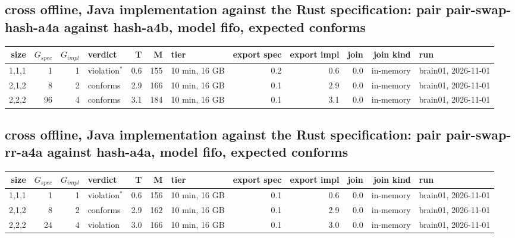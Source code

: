 \documentclass[10pt]{article}
\begin{document}
\subsection*{cross offline, Java implementation against the Rust specification: pair \textsf{pair-swap-hash-a4a} against \textsf{hash-a4b}, model fifo, expected conforms}
\begin{longtable}{@{}rrrlrrlrrrrl@{}}
\toprule
size & $G_{\mathit{spec}}$ & $G_{\mathit{impl}}$ & verdict & T & M & tier & export spec & export impl & join & join kind & run \\
\midrule
\endhead
\color{red} 1,1,1 & 1 & 1 & violation$^{\ast}$ & 0.6 & 155 & 10 min, 16 GB & 0.2 & 0.6 & 0.0 & in-memory & brain01, 2026-11-01 \\
\color{red} 2,1,2 & 8 & 2 & conforms & 2.9 & 166 & 10 min, 16 GB & 0.1 & 2.9 & 0.0 & in-memory & brain01, 2026-11-01 \\
\color{red} 2,2,2 & 96 & 4 & conforms & 3.1 & 184 & 10 min, 16 GB & 0.1 & 3.1 & 0.0 & in-memory & brain01, 2026-11-01 \\
\bottomrule
\end{longtable}
\subsection*{cross offline, Java implementation against the Rust specification: pair \textsf{pair-swap-rr-a4a} against \textsf{hash-a4a}, model fifo, expected conforms}
\begin{longtable}{@{}rrrlrrlrrrrl@{}}
\toprule
size & $G_{\mathit{spec}}$ & $G_{\mathit{impl}}$ & verdict & T & M & tier & export spec & export impl & join & join kind & run \\
\midrule
\endhead
\color{red} 1,1,1 & 1 & 1 & violation$^{\ast}$ & 0.6 & 156 & 10 min, 16 GB & 0.1 & 0.6 & 0.0 & in-memory & brain01, 2026-11-01 \\
\color{red} 2,1,2 & 8 & 2 & conforms & 2.9 & 162 & 10 min, 16 GB & 0.1 & 2.9 & 0.0 & in-memory & brain01, 2026-11-01 \\
\color{red} 2,2,2 & 24 & 4 & violation & 3.0 & 166 & 10 min, 16 GB & 0.1 & 3.0 & 0.0 & in-memory & brain01, 2026-11-01 \\
\bottomrule
\end{longtable}
\end{document}
